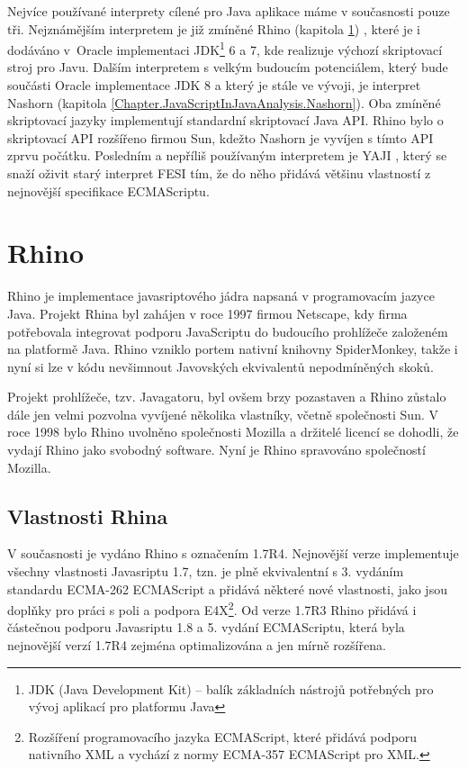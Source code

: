 Nejvíce používané interprety cílené pro Java aplikace máme v současnosti pouze tři. Nejznámějším interpretem je již zmíněné Rhino (kapitola \ref{Chapter.JavaScriptInJavaAnalysis.Rhino}) \cite{Bibliography.Rhino.Docs}, které je i dodáváno v~Oracle implementaci JDK\footnote{JDK (Java Development Kit) -- balík základních nástrojů potřebných pro vývoj aplikací pro platformu Java} 6 a 7, kde realizuje výchozí skriptovací stroj pro Javu. Dalším interpretem s velkým budoucím potenciálem, který bude součásti Oracle implementace JDK 8 a který je stále ve vývoji, je interpret Nashorn \cite{Bibliography.Nashorn.Project} (kapitola \ref{Chapter.JavaScriptInJavaAnalysis.Nashorn}). Oba zmíněné skriptovací jazyky implementují standardní skriptovací Java API. Rhino bylo o skriptovací API rozšířeno firmou Sun, kdežto Nashorn je vyvíjen s tímto API zprvu počátku. Posledním a nepříliš používaným interpretem je YAJI \cite{Bibliography.YAJI.Project}, který se snaží oživit starý interpret FESI \cite{Bibliography.FESI.Project} tím, že do něho přidává většinu vlastností z nejnovější specifikace ECMAScriptu.

\section{Rhino}
\label{Chapter.JavaScriptInJavaAnalysis.Rhino}

Rhino je implementace javasriptového jádra napsaná v programovacím jazyce Java. Projekt Rhina byl zahájen v roce 1997 firmou Netscape, kdy firma potřebovala integrovat podporu JavaScriptu do budoucího prohlížeče založeném na platformě Java. Rhino vzniklo portem nativní knihovny SpiderMonkey, takže i nyní si lze v kódu nevšimnout Javovských ekvivalentů nepodmíněných skoků. \cite{Bibliography.Rhino.History}

Projekt prohlížeče, tzv. Javagatoru, byl ovšem brzy pozastaven a Rhino zůstalo dále jen velmi pozvolna vyvíjené několika vlastníky, včetně společnosti Sun. V roce 1998 bylo Rhino uvolněno společnosti Mozilla a držitelé licencí se dohodli, že vydají Rhino jako svobodný software. Nyní je Rhino spravováno společností Mozilla. \cite{Bibliography.Rhino.History}

\subsection{Vlastnosti Rhina}
\label{Chapter.JavaScriptInJavaAnalysis.Rhino.RhinoFeatures}

V současnosti je vydáno Rhino s označením 1.7R4. Nejnovější verze implementuje všechny vlastnosti Javasriptu 1.7, tzn. je plně ekvivalentní s 3. vydáním standardu \linebreak ECMA-262 ECMAScript a přidává některé nové vlastnosti, jako jsou doplňky pro práci s poli a podpora E4X\footnote{Rozšíření programovacího jazyka ECMAScript, které přidává podporu nativního XML a vychází z normy ECMA-357 ECMAScript pro XML.}. Od verze 1.7R3 Rhino přidává i částečnou podporu Javasriptu 1.8 a 5. vydání ECMAScriptu, která byla nejnovější verzí 1.7R4 zejména optimalizována a jen mírně rozšířena. \cite{Bibliography.Rhino.v17R3,Bibliography.Rhino.v17R4}

